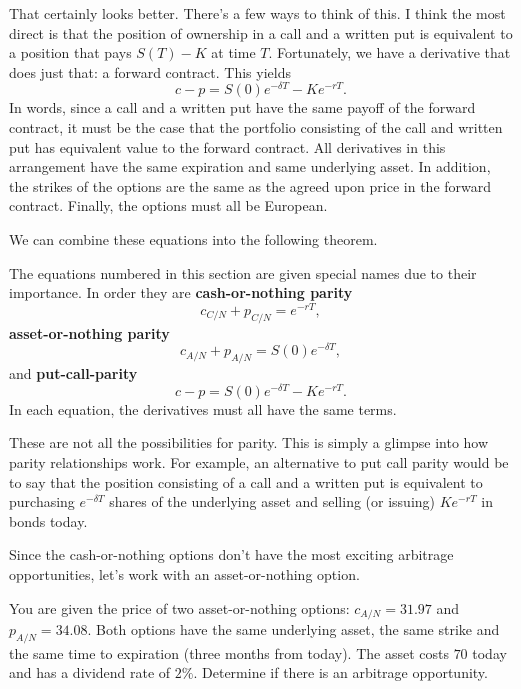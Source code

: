 \documentclass{ximera}
\begin{document}
That certainly looks better. There's a few ways to think of this. I think the most direct is that the position of ownership in a call and a written put is equivalent to a position that pays $S(T)-K$ at time $T$. Fortunately, we have a derivative that does just that: a forward contract. This yields
\begin{equation}
c-p=S(0)e^{-\delta T}-Ke^{-rT}.
\end{equation}
In words, since a call and a written put have the same payoff of the forward contract, it must be the case that the portfolio consisting of the call and written put has equivalent value to the forward contract. All derivatives in this arrangement have the same expiration and same underlying asset. In addition, the strikes of the options are the same as the agreed upon price in the forward contract. Finally, the options must all be European. 

We can combine these equations into the following theorem.

\begin{theorem}[Parity]
The equations numbered in this section are given special names due to their importance. In order they are {\bf cash-or-nothing parity}
	\begin{equation*}
	c_{C/N}+p_{C/N}=e^{-rT},
	\end{equation*}
{\bf asset-or-nothing parity}
	\begin{equation*}
	c_{A/N}+p_{A/N}=S(0)e^{-\delta T},
	\end{equation*}
and {\bf put-call-parity}
	\begin{equation*}
	c-p=S(0)e^{-\delta T}-Ke^{-rT}.
	\end{equation*}
In each equation, the derivatives must all have the same terms. 
\end{theorem}

\begin{remark}
These are not all the possibilities for parity. This is simply a glimpse into how parity relationships work. For example, an alternative to put call parity would be to say that the position consisting of a call and a written put is equivalent to purchasing $e^{-\delta T}$ shares of the underlying asset and selling (or issuing) $Ke^{-rT}$ in bonds today. 
\end{remark}

Since the cash-or-nothing options don't have the most exciting arbitrage opportunities, let's work with an asset-or-nothing option.

\begin{example}
You are given the price of two asset-or-nothing options: $c_{A/N}=31.97$ and $p_{A/N}=34.08$. Both options have the same underlying asset, the same strike and the same time to expiration (three months from today). The asset costs $70$ today and has a dividend rate of $2\%$. Determine if there is an arbitrage opportunity.
\end{example}
\end{document}
